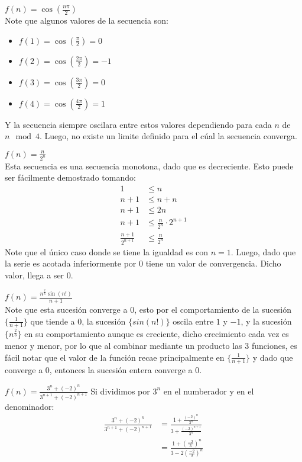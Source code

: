 \documentclass[../main.tex]{subfiles}
\begin{document}
\question $f(n) = \cos \left(\frac{n\pi}{2}\right)$\\

Note que algunos valores de la secuencia son:
\begin{itemize}
    \item $f(1) = \cos\left(\frac{\pi}{2}\right) = 0$
    \item $f(2) = \cos\left(\frac{2\pi}{2}\right) = -1$
    \item $f(3) = \cos\left(\frac{3\pi}{2}\right) = 0$
    \item $f(4) = \cos\left(\frac{4\pi}{2}\right) = 1$
\end{itemize}

Y la secuencia siempre oscilara entre estos valores dependiendo para cada $n$ de $n \mod{4}$. Luego, no existe un limite definido para el cúal la secuencia converga.

\question $f(n) = \frac{n}{2^n}$\\

Esta secuencia es una secuencia monotona, dado que es decreciente. Esto puede ser fácilmente demostrado tomando:
\begin{align*}
    1 &\le n\\
    n + 1 &\le n + n\\
    n + 1 &\le 2n\\
    n + 1 &\le \frac{n}{2^n} \cdot 2^{n+1}\\
    \frac{n+1}{2^{n+1}} &\le \frac{n}{2^n}
\end{align*}
Note que el único caso donde se tiene la igualdad es con $n = 1$. Luego, dado que la serie es acotada inferiormente por $0$ tiene un valor de convergencia. Dicho valor, llega a ser $0$.

\question $f(n) = \frac{n^{\frac{2}{3}} \sin(n!)}{n+1}$\\
Note que esta sucesión converge a $0$, esto por el comportamiento de la sucesión $\{\frac{1}{n+1}\}$ que tiende a $0$, la sucesión $\{sin(n!)\}$ oscila entre $1$ y $-1$, y la sucesión $\{n^{\frac{2}{3}}\}$ en su comportamiento aunque es creciente, dicho crecimiento cada vez es menor y menor, por lo que al combinar mediante un producto las 3 funciones, es fácil notar que el valor de la función recae principalmente en $\{\frac{1}{n+1}\}$ y dado que converge a $0$, entonces la sucesión entera converge a $0$.  

\question $f(n) = \frac{3^n + (-2)^n}{3^{n+1} + (-2)^{n+1}}$
Si dividimos por $3^{n}$ en el numberador y en el denominador:
\begin{align*}
    \frac{3^n + (-2)^n}{3^{n+1} + (-2)^{n+1}} &= \frac{1 + \frac{(-2)^n}{3^{n}}}{3 + \frac{(-2)^{n+1}}{3^{n}}}\\
    &= \frac{1 + \left(\frac{-2}{3}\right)^n}{3 - 2\left(\frac{-2}{3}\right)^n}\\
\end{align*}
\end{document}
